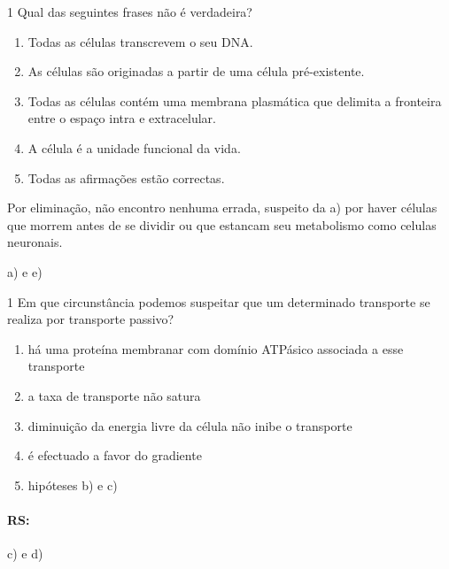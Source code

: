 \documentclass[\mainfilename]{subfiles}
\begin{document}
\begin{questionBox}1{ %
    Qual das seguintes frases não é verdadeira?
} %

    \begin{enumerate}[label=\alph{enumi})]
        \item Todas as células transcrevem o seu DNA.
        \item As células são originadas a partir de uma célula pré-existente.
        \item Todas as células contém uma membrana plasmática que delimita a fronteira entre o espaço intra e extracelular.
        \item A célula é a unidade funcional da vida.
        \item Todas as afirmações estão correctas.
    \end{enumerate}

    \begin{answerBox}{} %
        Por eliminação, não encontro nenhuma errada, suspeito da a) por haver células que morrem antes de se dividir ou que estancam seu metabolismo como celulas neuronais.

        a) e e)
    \end{answerBox}

\end{questionBox}

\begin{questionBox}1{ %
    Em que circunstância podemos suspeitar que um determinado transporte se realiza por transporte passivo?
} %
    
    \begin{enumerate}[label=\alph{enumi})]
        \item há uma proteína membranar com domínio ATPásico associada a esse transporte
        \item a taxa de transporte não satura
        \item diminuição da energia livre da célula não inibe o transporte 
        \item é efectuado a favor do gradiente
        \item hipóteses b) e c)
    \end{enumerate}

    \paragraph*{RS:} c) e d)

\end{questionBox}
\end{document}
